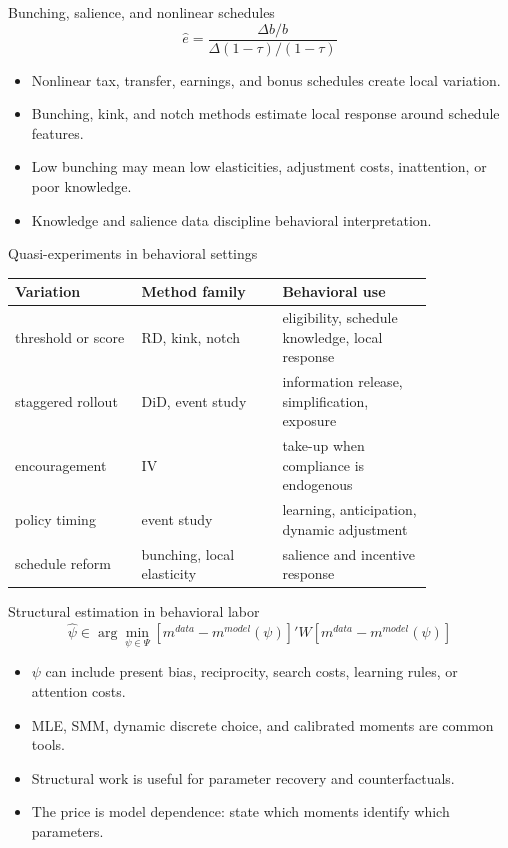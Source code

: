 \documentclass[aspectratio=169,11pt]{beamer}
\begin{document}
\begin{frame}{Bunching, salience, and nonlinear schedules}
\[
\hat e = \frac{\Delta b / b}{\Delta (1-\tau)/(1-\tau)}
\]

\begin{itemize}
    \item Nonlinear tax, transfer, earnings, and bonus schedules create local variation.
    \item Bunching, kink, and notch methods estimate local response around schedule features.
    \item Low bunching may mean low elasticities, adjustment costs, inattention, or poor knowledge.
    \item Knowledge and salience data discipline behavioral interpretation.
\end{itemize}
\end{frame}

\begin{frame}{Quasi-experiments in behavioral settings}
\small
\begin{tabular}{p{0.25\linewidth} p{0.28\linewidth} p{0.30\linewidth}}
\toprule
Variation & Method family & Behavioral use \\
\midrule
threshold or score & RD, kink, notch & eligibility, schedule knowledge, local response \\
staggered rollout & DiD, event study & information release, simplification, exposure \\
encouragement & IV & take-up when compliance is endogenous \\
policy timing & event study & learning, anticipation, dynamic adjustment \\
schedule reform & bunching, local elasticity & salience and incentive response \\
\bottomrule
\end{tabular}
\end{frame}

\begin{frame}{Structural estimation in behavioral labor}
\[
\hat \psi \in \arg\min_{\psi \in \Psi}
\left[m^{data}-m^{model}(\psi)\right]'W
\left[m^{data}-m^{model}(\psi)\right]
\]

\begin{itemize}
    \item $\psi$ can include present bias, reciprocity, search costs, learning rules, or attention costs.
    \item MLE, SMM, dynamic discrete choice, and calibrated moments are common tools.
    \item Structural work is useful for parameter recovery and counterfactuals.
    \item The price is model dependence: state which moments identify which parameters.
\end{itemize}
\end{frame}
\end{document}

